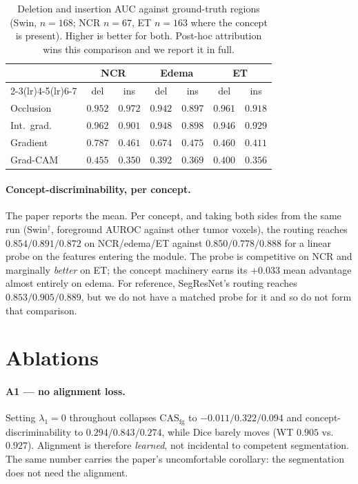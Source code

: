 \documentclass[10pt,twocolumn,letterpaper]{article}
\newcommand{\casfg}{\mathrm{CAS}_{\mathrm{fg}}}
\begin{document}
\begin{table}[t]\centering\footnotesize
\setlength{\tabcolsep}{4pt}
\caption{Deletion and insertion AUC against ground-truth regions (Swin, $n{=}168$; NCR
$n{=}67$, ET $n{=}163$ where the concept is present). Higher is better for both. Post-hoc
attribution wins this comparison and we report it in full.}
\label{tab:delins}
\begin{tabular}{lcccccc}
\toprule
& \multicolumn{2}{c}{NCR} & \multicolumn{2}{c}{Edema} & \multicolumn{2}{c}{ET} \\
\cmidrule(lr){2-3}\cmidrule(lr){4-5}\cmidrule(lr){6-7}
& del & ins & del & ins & del & ins \\
\midrule
Occlusion   & $0.952$ & $0.972$ & $0.942$ & $0.897$ & $0.961$ & $0.918$ \\
Int.\ grad. & $0.962$ & $0.901$ & $0.948$ & $0.898$ & $0.946$ & $0.929$ \\
Gradient    & $0.787$ & $0.461$ & $0.674$ & $0.475$ & $0.460$ & $0.411$ \\
Grad-CAM    & $0.455$ & $0.350$ & $0.392$ & $0.369$ & $0.400$ & $0.356$ \\
\bottomrule
\end{tabular}
\end{table}

\paragraph{Concept-discriminability, per concept.}
The paper reports the mean. Per concept, and taking both sides from the same run
(Swin$^\dagger$, foreground AUROC against other tumor voxels), the routing reaches
$0.854/0.891/0.872$ on NCR/edema/ET against $0.850/0.778/0.888$ for a linear probe on the
features entering the module. The probe is competitive on NCR and marginally \emph{better} on
ET; the concept machinery earns its $+0.033$ mean advantage almost entirely on edema. For
reference, SegResNet's routing reaches $0.853/0.905/0.889$, but we do not have a matched probe
for it and so do not form that comparison.

\section{Ablations}
\label{sec:ablations}

\paragraph{A1 --- no alignment loss.}
Setting $\lambda_1{=}0$ throughout collapses $\casfg$ to $-0.011/0.322/0.094$ and
concept-discriminability to $0.294/0.843/0.274$, while Dice barely moves (WT $0.905$ vs.\
$0.927$). Alignment is therefore \emph{learned}, not incidental to competent segmentation.
The same number carries the paper's uncomfortable corollary: the segmentation does not need
the alignment.
\end{document}
